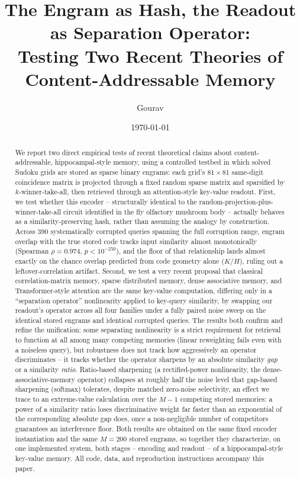 \documentclass[11pt]{article}
\title{The Engram as Hash, the Readout as Separation Operator:\\
Testing Two Recent Theories of Content-Addressable Memory}
\author{Gourav}
\date{\today}
\begin{document}
\maketitle

\begin{abstract}
We report two direct empirical tests of recent theoretical claims about content-addressable,
hippocampal-style memory, using a controlled testbed in which solved Sudoku grids are stored
as sparse binary engrams: each grid's $81\times81$ same-digit coincidence matrix is projected
through a fixed random sparse matrix and sparsified by $k$-winner-take-all, then retrieved
through an attention-style key-value readout. First, we test whether this encoder --
structurally identical to the random-projection-plus-winner-take-all circuit identified in the
fly olfactory mushroom body -- actually behaves as a similarity-preserving hash, rather than
assuming the analogy by construction. Across $390$ systematically corrupted queries spanning
the full corruption range, engram overlap with the true stored code tracks input similarity
almost monotonically (Spearman $\rho=0.974$, $p<10^{-250}$), and the floor of that relationship
lands almost exactly on the chance overlap predicted from code geometry alone ($K/H$), ruling
out a leftover-correlation artifact. Second, we test a very recent proposal that classical
correlation-matrix memory, sparse distributed memory, dense associative memory, and
Transformer-style attention are the same key-value computation, differing only in a
``separation operator'' nonlinearity applied to key-query similarity, by swapping our
readout's operator across all four families under a fully paired noise sweep on the identical
stored engrams and identical corrupted queries. The results both confirm and refine the
unification: some separating nonlinearity is a strict requirement for retrieval to function at
all among many competing memories (linear reweighting fails even with a noiseless query), but
robustness does not track how aggressively an operator discriminates -- it tracks whether the
operator sharpens by an absolute similarity \emph{gap} or a similarity \emph{ratio}.
Ratio-based sharpening (a rectified-power nonlinearity, the dense-associative-memory operator)
collapses at roughly half the noise level that gap-based sharpening (softmax) tolerates,
despite matched zero-noise selectivity, an effect we trace to an extreme-value calculation
over the $M-1$ competing stored memories: a power of a similarity ratio loses discriminative
weight far faster than an exponential of the corresponding absolute gap does, once a
non-negligible number of competitors guarantees an interference floor. Both results are
obtained on the same fixed encoder instantiation and the same $M=200$ stored engrams, so
together they characterize, on one implemented system, both stages -- encoding and readout --
of a hippocampal-style key-value memory. All code, data, and reproduction instructions
accompany this paper.
\end{abstract}
\end{document}
